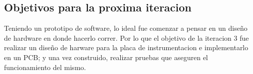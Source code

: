 \subsection{Objetivos para la proxima iteracion} %
\label{sub:objetivos_para_la_proxima_iteracion}

Teniendo un prototipo de software, lo ideal fue comenzar a pensar en un diseño de hardware en donde hacerlo correr. Por lo que el objetivo de la iteracion 3 fue realizar un diseño de harware para la placa de instrumentacion e implementarlo en un PCB; y una vez construido, realizar pruebas que aseguren el funcionamiento del mismo.


